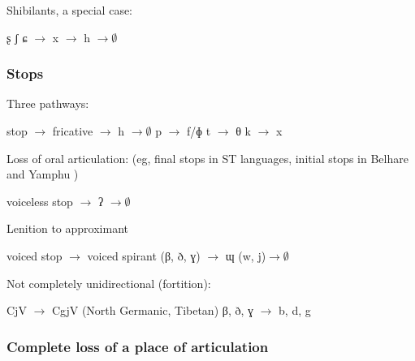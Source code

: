 \documentclass[oldfontcommands,oneside,a4paper,11pt]{article}
\begin{document}
Shibilants, a special case:

\begin{exe}
\ex
\glt ʂ ʃ ɕ $\rightarrow$  x $\rightarrow$ h $\rightarrow \emptyset$ 
\end{exe}


 \subsubsection{Stops}
 
 Three pathways:
 \begin{exe}
\ex
\glt stop $\rightarrow$  fricative $\rightarrow$ h $\rightarrow \emptyset$ 
\glt p $\rightarrow$  f/ɸ
\glt t $\rightarrow$  θ
\glt k $\rightarrow$  x
\end{exe}


Loss of oral articulation: (eg, final stops in ST languages, initial stops in Belhare and Yamphu \citealt{michailovsky10kiranti})
 \begin{exe}
\ex
\glt voiceless stop $\rightarrow$  ʔ $\rightarrow \emptyset$ 
\end{exe}

Lenition to approximant

\begin{exe}
\ex
\glt voiced stop  $\rightarrow$ voiced spirant (β, ð, ɣ) $\rightarrow$ ɰ (w, j)$\rightarrow \emptyset$ 
\end{exe} 

Not completely unidirectional (fortition):

\begin{exe}
\ex
\glt CjV $\rightarrow$ CgjV (North Germanic, Tibetan)
\glt β, ð, ɣ $\rightarrow$ b, d, g
\end{exe} 

  
 \subsubsection{Complete loss of a place of articulation}
\end{document}
